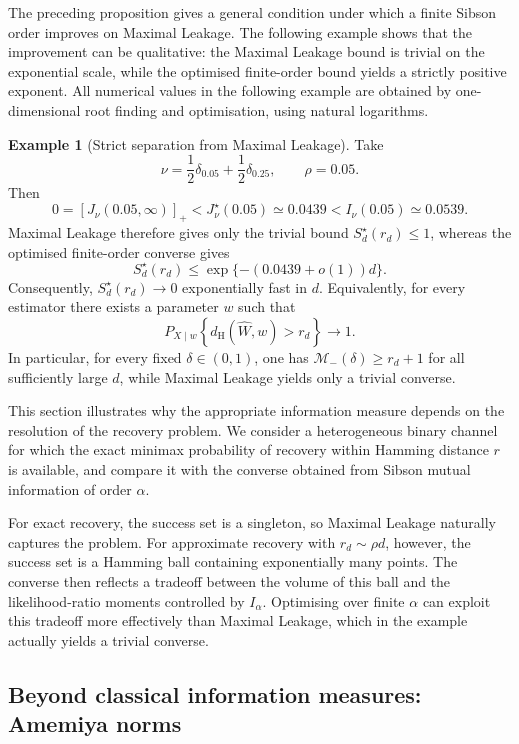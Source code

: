 \documentclass[11pt]{article}
\theoremstyle{definition}
\newtheorem{example}[theorem]{Example}
\theoremstyle{remark}
\newcommand{\1}{\boldsymbol{1}}
\begin{document}
The preceding proposition gives a general condition under which a
finite Sibson order improves on Maximal Leakage. The following example
shows that the improvement can be qualitative: the Maximal Leakage
bound is trivial on the exponential scale, while the optimised
finite-order bound yields a strictly positive exponent. All numerical values in the following example are obtained by
one-dimensional root finding and optimisation, using natural
logarithms.

\begin{example}[Strict separation from Maximal Leakage]
\label{ex:heterogeneousSibsonSeparation}
Take
\[
\nu=\frac12\delta_{0.05}+\frac12\delta_{0.25},
\qquad
\rho=0.05.
\]
Then
\[
0
=
[J_\nu(0.05,\infty)]_+
<
J_\nu^\star(0.05) \simeq0.0439
<
I_\nu(0.05) \simeq0.0539.
\]
Maximal Leakage therefore gives only the trivial bound
\(S_d^\star(r_d)\le1\), whereas the optimised finite-order converse gives
\[
S_d^\star(r_d)
\le
\exp\{-(0.0439+o(1))d\}.
\]
Consequently, \(S_d^\star(r_d)\to0\) exponentially fast in $d$. Equivalently, for every estimator there exists a parameter \(w\) such that
\[
P_{X\mid w}\!\left\{d_{\mathrm H}(\widehat W,w)>r_d\right\}\longrightarrow1.
\]
In particular, for every fixed \(\delta\in(0,1)\), one has \(\mathcal M_-(\delta)\ge r_d+1\) for all sufficiently large \(d\), while Maximal Leakage yields only a trivial converse.
\end{example}

This section illustrates why the appropriate information measure depends on the resolution of the recovery problem. We consider a heterogeneous binary channel for which the exact minimax probability of recovery within Hamming distance \(r\) is available, and compare it with the converse obtained from Sibson mutual information of order \(\alpha\).

For exact recovery, the success set is a singleton, so Maximal Leakage naturally captures the problem. For approximate recovery with \(r_d\sim\rho d\), however, the success set is a Hamming ball containing exponentially many points. The converse then reflects a tradeoff between the volume of this ball and the likelihood-ratio moments controlled by \(I_\alpha\). Optimising over finite \(\alpha\) can exploit this tradeoff more effectively than Maximal Leakage, which in the example actually yields a trivial converse.
\subsection{Beyond classical information measures: Amemiya norms}
\label{sec:amemiya-outlier}
\end{document}

